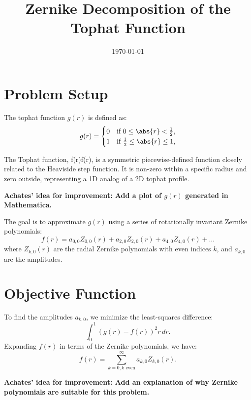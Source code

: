 \documentclass[12pt]{article}
\title{Zernike Decomposition of the Tophat Function}
\author{}
\date{\today}
\begin{document}
\maketitle

\section{Problem Setup}
The tophat function \( g(r) \) is defined as:
\begin{equation}
g(r) = 
\begin{cases} 
0 & \text{if } 0 \leq \abs{r} < \frac{1}{2}, \\
1 & \text{if } \frac{1}{2} \leq \abs{r} \leq 1, \\
\end{cases}
\end{equation}

The Tophat function, f(r)f(r), is a symmetric piecewise-defined function closely related to the Heaviside step function. It is non-zero within a specific radius and zero outside, representing a 1D analog of a 2D tophat profile.

\begin{center}
\textbf{Achates' idea for improvement: Add a plot of \( g(r) \) generated in Mathematica.}
\end{center}

The goal is to approximate \( g(r) \) using a series of rotationally invariant Zernike polynomials:
\begin{equation}
f(r) = a_{0,0} Z_{0,0}(r) + a_{2,0} Z_{2,0}(r) + a_{4,0} Z_{4,0}(r) + \dots
\end{equation}
where \( Z_{k,0}(r) \) are the radial Zernike polynomials with even indices \( k \), and \( a_{k,0} \) are the amplitudes.

\section{Objective Function}
To find the amplitudes \( a_{k,0} \), we minimize the least-squares difference:
\begin{equation}
\int_{0}^{1} \left( g(r) - f(r) \right)^2 r \, dr.
\end{equation}
Expanding \( f(r) \) in terms of the Zernike polynomials, we have:
\begin{equation}
f(r) = \sum_{k=0, k \text{ even}}^{\infty} a_{k,0} Z_{k,0}(r).
\end{equation}

\begin{center}
\textbf{Achates' idea for improvement: Add an explanation of why Zernike polynomials are suitable for this problem.}
\end{center}
\end{document}
